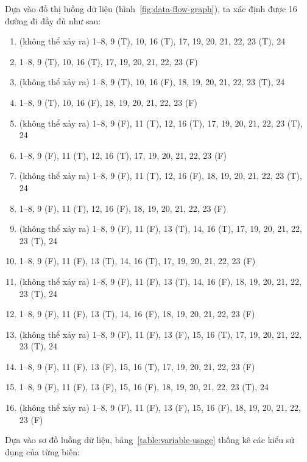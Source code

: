 \documentclass{article}
\begin{document}
\bigskip
\par Dựa vào đồ thị luồng dữ liệu (hình~\ref{fig:data-flow-graph}), ta xác định được 16 đường đi đầy đủ như sau:
\bigskip

\begin{enumerate}[label = (\arabic*),itemindent=1cm]
    \item (không thể xảy ra) 1--8, 9 (T), 10, 16 (T), 17, 19, 20, 21, 22, 23 (T), 24 %
    \item 1--8, 9 (T), 10, 16 (T), 17, 19, 20, 21, 22, 23 (F) %
    \item (không thể xảy ra) 1--8, 9 (T), 10, 16 (F), 18, 19, 20, 21, 22, 23 (T), 24 %
    \item 1--8, 9 (T), 10, 16 (F), 18, 19, 20, 21, 22, 23 (F) %
    \item (không thể xảy ra) 1--8, 9 (F), 11 (T), 12, 16 (T), 17, 19, 20, 21, 22, 23 (T), 24 %
    \item 1--8, 9 (F), 11 (T), 12, 16 (T), 17, 19, 20, 21, 22, 23 (F) %
    \item (không thể xảy ra) 1--8, 9 (F), 11 (T), 12, 16 (F), 18, 19, 20, 21, 22, 23 (T), 24 %
    \item 1--8, 9 (F), 11 (T), 12, 16 (F), 18, 19, 20, 21, 22, 23 (F) %
    \item (không thể xảy ra) 1--8, 9 (F), 11 (F), 13 (T), 14, 16 (T), 17, 19, 20, 21, 22, 23 (T), 24 %
    \item 1--8, 9 (F), 11 (F), 13 (T), 14, 16 (T), 17, 19, 20, 21, 22, 23 (F) %
    \item (không thể xảy ra) 1--8, 9 (F), 11 (F), 13 (T), 14, 16 (F), 18, 19, 20, 21, 22, 23 (T), 24 %
    \item 1--8, 9 (F), 11 (F), 13 (T), 14, 16 (F), 18, 19, 20, 21, 22, 23 (F) %
    \item (không thể xảy ra) 1--8, 9 (F), 11 (F), 13 (F), 15, 16 (T), 17, 19, 20, 21, 22, 23 (T), 24 %
    \item 1--8, 9 (F), 11 (F), 13 (F), 15, 16 (T), 17, 19, 20, 21, 22, 23 (F) %
    \item 1--8, 9 (F), 11 (F), 13 (F), 15, 16 (F), 18, 19, 20, 21, 22, 23 (T), 24 %
    \item (không thể xảy ra) 1--8, 9 (F), 11 (F), 13 (F), 15, 16 (F), 18, 19, 20, 21, 22, 23 (F) %
\end{enumerate}

\bigskip
\bigskip
\bigskip
\par Dựa vào sơ đồ luồng dữ liệu, bảng~\ref{table:variable-usage} thống kê các kiểu sử dụng của từng biến:
\bigskip
\bigskip
\bigskip
\end{document}
